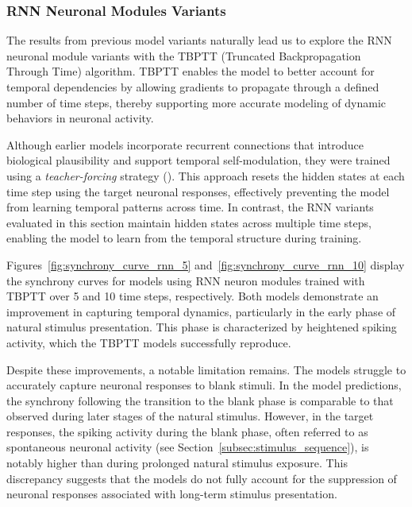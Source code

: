 \subsubsection{RNN Neuronal Modules Variants}
\label{{subsubsec:rnn_eval}}

The results from previous model variants naturally lead us to explore the RNN neuronal module variants with the TBPTT (Truncated Backpropagation Through Time) algorithm. TBPTT enables the model to better account for temporal dependencies by allowing gradients to propagate through a defined number of time steps, thereby supporting more accurate modeling of dynamic behaviors in neuronal activity.

Although earlier models incorporate recurrent connections that introduce biological plausibility and support temporal self-modulation, they were trained using a \emph{teacher-forcing} strategy (\citet{NIPS2016_16026d60}). This approach resets the hidden states at each time step using the target neuronal responses, effectively preventing the model from learning temporal patterns across time. In contrast, the RNN variants evaluated in this section maintain hidden states across multiple time steps, enabling the model to learn from the temporal structure during training.

Figures~\ref{fig:synchrony_curve_rnn_5} and~\ref{fig:synchrony_curve_rnn_10} display the synchrony curves for models using RNN neuron modules trained with TBPTT over 5 and 10 time steps, respectively. Both models demonstrate an improvement in capturing temporal dynamics, particularly in the early phase of natural stimulus presentation. This phase is characterized by heightened spiking activity, which the TBPTT models successfully reproduce.

Despite these improvements, a notable limitation remains. The models struggle to accurately capture neuronal responses to blank stimuli. In the model predictions, the synchrony following the transition to the blank phase is comparable to that observed during later stages of the natural stimulus. However, in the target responses, the spiking activity during the blank phase, often referred to as spontaneous neuronal activity (see Section~\ref{subsec:stimulus_sequence}), is notably higher than during prolonged natural stimulus exposure. This discrepancy suggests that the models do not fully account for the suppression of neuronal responses associated with long-term stimulus presentation.

